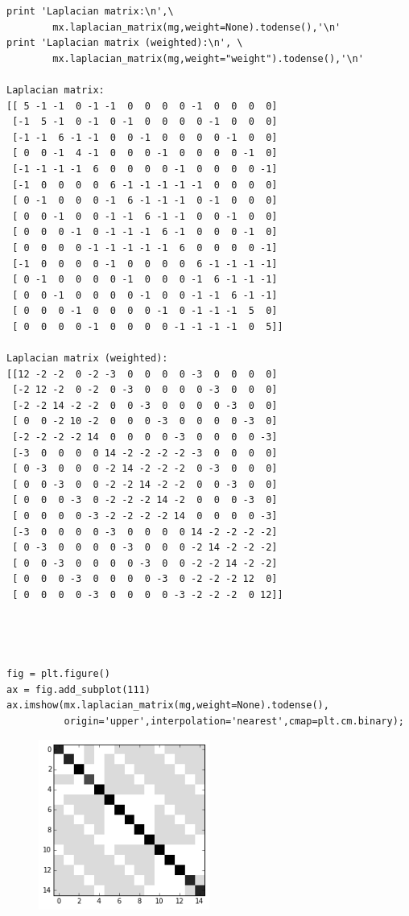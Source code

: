 \documentclass[11pt]{article}
\begin{document}
\begin{verbatim}
print 'Laplacian matrix:\n',\
        mx.laplacian_matrix(mg,weight=None).todense(),'\n'
print 'Laplacian matrix (weighted):\n', \
        mx.laplacian_matrix(mg,weight="weight").todense(),'\n'

Laplacian matrix:
[[ 5 -1 -1  0 -1 -1  0  0  0  0 -1  0  0  0  0]
 [-1  5 -1  0 -1  0 -1  0  0  0  0 -1  0  0  0]
 [-1 -1  6 -1 -1  0  0 -1  0  0  0  0 -1  0  0]
 [ 0  0 -1  4 -1  0  0  0 -1  0  0  0  0 -1  0]
 [-1 -1 -1 -1  6  0  0  0  0 -1  0  0  0  0 -1]
 [-1  0  0  0  0  6 -1 -1 -1 -1 -1  0  0  0  0]
 [ 0 -1  0  0  0 -1  6 -1 -1 -1  0 -1  0  0  0]
 [ 0  0 -1  0  0 -1 -1  6 -1 -1  0  0 -1  0  0]
 [ 0  0  0 -1  0 -1 -1 -1  6 -1  0  0  0 -1  0]
 [ 0  0  0  0 -1 -1 -1 -1 -1  6  0  0  0  0 -1]
 [-1  0  0  0  0 -1  0  0  0  0  6 -1 -1 -1 -1]
 [ 0 -1  0  0  0  0 -1  0  0  0 -1  6 -1 -1 -1]
 [ 0  0 -1  0  0  0  0 -1  0  0 -1 -1  6 -1 -1]
 [ 0  0  0 -1  0  0  0  0 -1  0 -1 -1 -1  5  0]
 [ 0  0  0  0 -1  0  0  0  0 -1 -1 -1 -1  0  5]] 

Laplacian matrix (weighted):
[[12 -2 -2  0 -2 -3  0  0  0  0 -3  0  0  0  0]
 [-2 12 -2  0 -2  0 -3  0  0  0  0 -3  0  0  0]
 [-2 -2 14 -2 -2  0  0 -3  0  0  0  0 -3  0  0]
 [ 0  0 -2 10 -2  0  0  0 -3  0  0  0  0 -3  0]
 [-2 -2 -2 -2 14  0  0  0  0 -3  0  0  0  0 -3]
 [-3  0  0  0  0 14 -2 -2 -2 -2 -3  0  0  0  0]
 [ 0 -3  0  0  0 -2 14 -2 -2 -2  0 -3  0  0  0]
 [ 0  0 -3  0  0 -2 -2 14 -2 -2  0  0 -3  0  0]
 [ 0  0  0 -3  0 -2 -2 -2 14 -2  0  0  0 -3  0]
 [ 0  0  0  0 -3 -2 -2 -2 -2 14  0  0  0  0 -3]
 [-3  0  0  0  0 -3  0  0  0  0 14 -2 -2 -2 -2]
 [ 0 -3  0  0  0  0 -3  0  0  0 -2 14 -2 -2 -2]
 [ 0  0 -3  0  0  0  0 -3  0  0 -2 -2 14 -2 -2]
 [ 0  0  0 -3  0  0  0  0 -3  0 -2 -2 -2 12  0]
 [ 0  0  0  0 -3  0  0  0  0 -3 -2 -2 -2  0 12]] 




fig = plt.figure()
ax = fig.add_subplot(111)
ax.imshow(mx.laplacian_matrix(mg,weight=None).todense(),
          origin='upper',interpolation='nearest',cmap=plt.cm.binary);
\end{verbatim}

\begin{figure}[htbp]
\centering
\includegraphics[width=0.5\textwidth]{output_37_0.png}
\end{figure}
\end{document}
